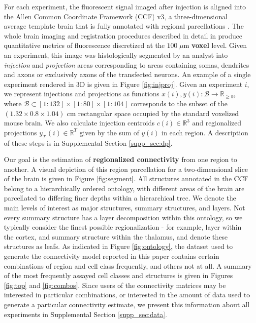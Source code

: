 For each experiment, the fluorescent signal imaged after injection is aligned into the Allen Common Coordinate Framework (CCF) v3, a three-dimensional average template brain that is fully annotated with regional parcellations \citep{Wang2020-po}.
The whole brain imaging and registration procedures described in detail in \citet{Oh2014-kh, Kuan2015-zz} produce quantitative metrics of fluorescence discretized at the $100 \; \mu$m \textbf{voxel} level. 
Given an experiment, this image was histologically segmented by an analyst into \textit{injection} and \textit{projection} areas corresponding to areas containing somas, dendrites and axons or exclusively axons of the transfected neurons.
An example of a single experiment rendered in 3D is given in Figure \ref{fig:injproj}.
Given an experiment $i$, we represent injections and projections as functions $x(i),y(i) : \mathcal B \to \mathbb R_{\geq 0}$, where $\mathcal B \subset [1:132] \times [1:80] \times [1:104]$ corresponds to the subset of the $(1.32 \times 0.8 \times 1.04)$ cm rectangular space occupied by the standard voxelized mouse brain.
We also calculate injection centroids $c(i) \in \mathbb R^3$ and regionalized projections $y_{\mathcal T} (i) \in \mathbb R^{T} $ given by the sum of $y(i)$ in each region.
A description of these steps is in Supplemental Section \ref{supp_sec:dp}.

Our goal is the estimation of \textbf{regionalized connectivity} from one region to another.
A visual depiction of this region parcellation for a two-dimensional slice of the brain is given in Figure \ref{fig:segment}.
All structures annotated in the CCF belong to a hierarchically ordered ontology, with different areas of the brain are parcellated to differing finer depths within a hierarchical tree.
We denote the main levels of interest as major structures, summary structures, and layers.
Not every summary structure has a layer decomposition within this ontology, so we typically consider the finest possible regionalization - for example, layer within the cortex, and summary structure within the thalamus, and denote these structures as leafs.
As indicated in Figure \ref{fig:ontology}, the dataset used to generate the connectivity model reported in this paper contains certain combinations of region and cell class frequently, and others not at all.
A summary of the most frequently assayed cell classes and structures is given in Figures \ref{fig:top} and \ref{fig:combos}.
Since users of the connectivity matrices may be interested in particular combinations, or interested in the amount of data used to generate a particular connectivity estimate, we present this information about all experiments in Supplemental Section \ref*{supp_sec:data}.

